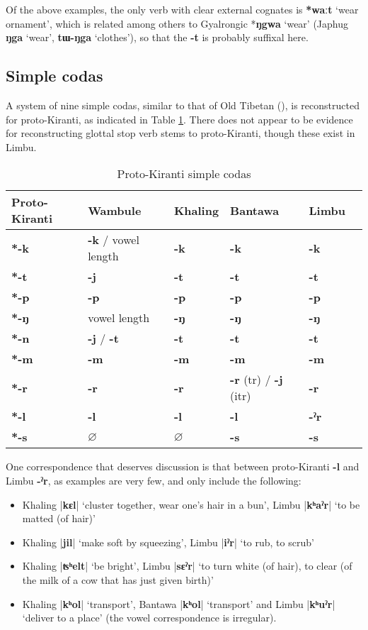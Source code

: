 \documentclass[oneside,a4paper,11pt]{article}
\newcommand{\ipa}[1]{\textbf{{\phon\mbox{#1}}}} %
\newcommand{\dhatu}[2]{|\ipa{#1}| `#2'}
\begin{document}
Of the above examples, the only verb with clear external cognates is \ipa{*waːt} `wear ornament', which is related among others to Gyalrongic *\ipa{ŋgwa} `wear' (Japhug \ipa{ŋga} `wear', \ipa{tɯ-ŋga} `clothes'), so that the \ipa{-t} is probably suffixal here. 

\subsection{Simple codas} \label{sec:codas}
A system of nine simple codas, similar to that of Old Tibetan (\citealt{hill10synchronic}), is reconstructed for proto-Kiranti, as indicated in Table \ref{tab:codas}. There does not appear to be evidence for reconstructing glottal stop verb stems to proto-Kiranti, though these exist in Limbu.

\begin{table}[H]
\caption{Proto-Kiranti simple codas} \centering \label{tab:codas}
\begin{tabular}{llllll}
\toprule
Proto-Kiranti & Wambule & Khaling & Bantawa & Limbu \\
\midrule
\ipa{*-k} & \ipa{-k} / vowel length& \ipa{-k} & \ipa{-k} & \ipa{-k}  \\
\ipa{*-t} & \ipa{-j} & \ipa{-t} & \ipa{-t} & \ipa{-t}  \\
\ipa{*-p} & \ipa{-p} & \ipa{-p} & \ipa{-p} & \ipa{-p}  \\
\midrule
\ipa{*-ŋ} & vowel length & \ipa{-ŋ} & \ipa{-ŋ} & \ipa{-ŋ}  \\
\ipa{*-n} & \ipa{-j} /  \ipa{-t} & \ipa{-t} & \ipa{-t} & \ipa{-t}  \\
\ipa{*-m} & \ipa{-m} & \ipa{-m} & \ipa{-m} & \ipa{-m}  \\
\midrule
\ipa{*-r} &  \ipa{-r}  & \ipa{-r} & \ipa{-r} (tr) / \ipa{-j} (itr) & \ipa{-r}  \\
\ipa{*-l} & \ipa{-l}  & \ipa{-l} & \ipa{-l} & \ipa{-ˀr}  \\
\ipa{*-s} &$\varnothing$ & $\varnothing$ & \ipa{-s} & \ipa{-s}  \\
\bottomrule
\end{tabular}
\end{table}

One correspondence that deserves discussion is that between proto-Kiranti \ipa{-l} and Limbu \ipa{-ˀr}, as examples are very few, and only include the following:

\begin{itemize}
\item  Khaling \dhatu{kɛl}{cluster together, wear one's hair in a bun}, Limbu \dhatu{kʰaˀr}{to be matted (of hair)}  			 
\item  Khaling \dhatu{jil}{make soft by squeezing}, Limbu \dhatu{iˀr}{to rub, to scrub}  		 
\item   Khaling \dhatu{ʦʰelt}{be bright}, Limbu \dhatu{sɛˀr}{to turn white (of hair), to clear (of the milk of a cow that has just given birth)}  
\item Khaling \dhatu{kʰol}{transport}, Bantawa	  \dhatu{kʰol}{transport}	 and	 Limbu \dhatu{kʰuˀr}{deliver to a place}	  (the vowel correspondence is irregular).
\end{itemize}
\end{document}
